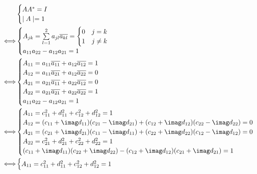\documentclass[dvipdfmx,titlepage, 11pt, a4paper]{jsarticle}%
\begin{document}
\begin{itemize}
\begin{align*}
        & \begin{cases}
            AA^{\ast} = I\\
            \mid A\mid = 1
        \end{cases}\\
        \Longleftrightarrow & 
        \begin{cases}
            A_{jk} = \sum\limits_{l = 1}^{2} a_{jl}\overline{a_{kl}}
            = 
            \begin{cases}
                0 & j = k\\
                1 & j \neq k  
            \end{cases}\\
            a_{11}a_{22} - a_{12}a_{21} = 1
        \end{cases}\\
        \Longleftrightarrow & 
        \begin{cases}
            A_{11} = a_{11}\overline{a_{11}} + a_{12}\overline{a_{12}} = 1\\
            A_{12} = a_{11}\overline{a_{21}} + a_{12}\overline{a_{22}} = 0\\
            A_{21} = a_{21}\overline{a_{11}} + a_{22}\overline{a_{12}} = 0\\
            A_{22} = a_{21}\overline{a_{21}} + a_{22}\overline{a_{22}} = 1\\
            a_{11}a_{22} - a_{12}a_{21} = 1
        \end{cases}\\
        \Longleftrightarrow & 
        \begin{cases}
            A_{11} = c_{11}^{2} + d_{11}^{2} + c_{12}^{2} + d_{12}^{2} = 1\\
            A_{12} = (c_{11} + \imag d_{11})(c_{21} - \imag d_{21}) + (c_{12} + \imag d_{12})(c_{22} - \imag d_{22}) = 0\\
            A_{21} = (c_{21} + \imag d_{21})(c_{11} - \imag d_{11}) + (c_{22} + \imag d_{22})(c_{12} - \imag d_{12}) = 0\\
            A_{22} = c_{21}^{2} + d_{21}^{2} + c_{22}^{2} + d_{22}^{2} = 1\\
            (c_{11} + \imag d_{11})(c_{22} + \imag d_{22}) - (c_{12} + \imag d_{12})(c_{21} + \imag d_{21}) = 1
        \end{cases}\\
        \Longleftrightarrow & 
        \begin{cases}
            A_{11} = c_{11}^{2} + d_{11}^{2} + c_{12}^{2} + d_{12}^{2} = 1\\

\end{cases}
\end{align*}
\end{itemize}
\end{document}

